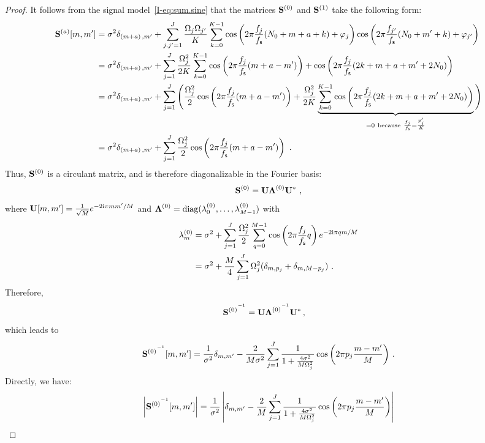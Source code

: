 \documentclass[journal,onecolumn]{IEEEtran}
\begin{document}
\begin{proof}
It follows from the signal model~\eqref{I-eq:sum.sine} that the matrices ${\mathbf S}^{(0)}$ and ${\mathbf S}^{(1)}$ take the following form:
\begin{align}
\nonumber
\bS^{(a)}[m,m'] &= \sigma^2\delta_{(m+a)\,,m'}+\sum_{j,j'=1}^J\dfrac{\Omega_j\Omega_{j'}}{K}\sum_{k=0}^{K-1} \cos\left(2\pi \frac{f_j}{\fs}(N_0+m+a+k)+\varphi_j\right)\cos\left(2\pi \frac{f_{j'}}{\fs}(N_0+m'+k)+\varphi_{j'}\right) \\
\nonumber
&= \sigma^2\delta_{(m+a)\,,m'}+\sum_{j=1}^J\dfrac{\Omega_j^2}{2K}\sum_{k=0}^{K-1} \cos\left(2\pi \frac{f_j}{\fs}(m+a-m')\right) + \cos\left(2\pi \frac{f_j}{\fs}(2k+m+a+m'+2N_0)\right)\\
\nonumber
&= \sigma^2\delta_{(m+a)\,,m'}+\sum_{j=1}^J\Bigg( \dfrac{\Omega_j^2}2\cos\left(2\pi \frac{f_j}{\fs}(m+a-m')\right) + \dfrac{\Omega_j^2}{2K}\underbrace{\sum_{k=0}^{K-1}\cos\left(2\pi \frac{f_j}{\fs}(2k+m+a+m'+2N_0)\right)}_{=0\ \mathrm{because}\ \frac{f_j}\fs=\frac{p'_j}K } \Bigg)\\
&= \sigma^2\delta_{(m+a)\,,m'}+\sum_{j=1}^J\dfrac{\Omega_j^2}2\cos\left(2\pi \frac{f_j}{\fs}(m+a-m')\right)\ .
\label{eq:S1}
\end{align}
Thus, ${\mathbf S}^{(0)}$ is a circulant matrix, and is therefore diagonalizable in the Fourier basis:
\[
{\mathbf S}^{(0)} = {\mathbf U}\boldsymbol{\Lambda}^{(0)}{\mathbf U}^*\ ,
\]
where ${\mathbf U}[m,m']=\frac1{\sqrt{M}}e^{-2\mathrm{i}\pi mm'/M}$ and $\boldsymbol{\Lambda}^{(0)} = \mathrm{diag}(\lambda_0^{(0)},\dots,\lambda_{M-1}^{(0)})$ with
\begin{align*}
\lambda_m^{(0)} &= \sigma^2 + \sum_{j=1}^J\dfrac{\Omega_j^2}2\sum_{q=0}^{M-1} \cos\left(2\pi\frac{f_j}{f_{\mathsf s}} q\right) e^{-2\mathrm{i}\pi qm/M} \\
&= \sigma^2 + \dfrac{M}{4}\sum_{j=1}^J\Omega_j^2(\delta_{m,p_j} + \delta_{m,M-p_j})\ .
\end{align*}
Therefore,
\begin{align*}
{{\mathbf S}^{(0)}}^{^{-1}}  &= {\mathbf U}{\boldsymbol{\Lambda}^{(0)}}^{^{-1}}{\mathbf U}^*\,,
\end{align*}
which leads to
\begin{equation}
{\bS^{(0)}}^\inv[m,m']  = \dfrac1{\sigma^2}\delta_{m,m'}-\dfrac{2}{M\sigma^2}\sum_{j=1}^J\dfrac{1}{1+\frac{4\sigma^2}{M\Omega_j^2}}\cos\left(2\pi p_j \dfrac{m-m'}{M}\right)\,.
\label{eq:S0.inv.2}
\end{equation}
Directly, we have:
\begin{align*}
\left|{\bS^{(0)}}^\inv[m,m']\right|  &= \dfrac1{\sigma^2}\left|\delta_{m,m'}-\dfrac{2}{M}\sum_{j=1}^J\dfrac{1}{1+\frac{4\sigma^2}{M\Omega_j^2}}\cos\left(2\pi p_j \dfrac{m-m'}{M}\right)\right| \\

\end{align*}
\end{proof}
\end{document}
